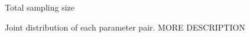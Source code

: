 \begin{figure}[H]

    \begin{center}
    \end{center}

    \caption{Total sampling size}
    \label{fig:resultCurve_uni}


\end{figure}

\begin{figure}[ht]
    \begin{center}
    \end{center}
    \caption[Joint density distribution of each parameter pair]%
    {Joint distribution of each parameter pair. MORE DESCRIPTION}
    \label{fig:model5_para_joint}
\end{figure}

